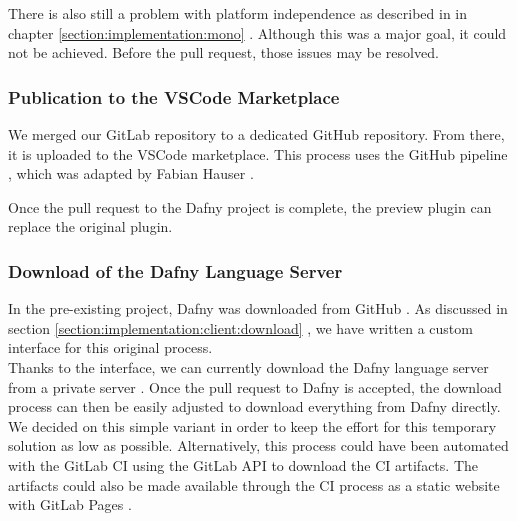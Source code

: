 There is also still a problem with platform independence as described in in chapter \ref{section:implementation:mono} .
Although this was a major goal, it could not be achieved.
Before the pull request, those issues may be resolved.


\subsubsection{Publication to the VSCode Marketplace}
We merged our GitLab repository to a dedicated GitHub repository.
From there, it is uploaded to the VSCode marketplace.
This process uses the GitHub pipeline , which
was adapted by Fabian Hauser \cite{our-dafny-plugin-github-publish}.

Once the pull request to the Dafny project is complete,
the preview plugin can replace the original plugin.


\subsubsection{Download of the Dafny Language Server}
In the pre-existing project, Dafny was downloaded from GitHub \cite{dafny_lang_builds}.
As discussed in section \ref{section:implementation:client:download} ,
we have written a custom interface for this original process.\\

Thanks to the interface, we can currently download the Dafny language server from a private server \cite{client-serverStringResources}.
Once the pull request to Dafny is accepted, the download process can then be easily adjusted to download everything from Dafny directly.\\

We decided on this simple variant in order to keep the effort for this temporary solution as low as possible.
Alternatively, this process could have been automated with the GitLab CI using the GitLab API \cite{gitlab-api} to download the CI artifacts.
The artifacts could also be made available through the CI process as a static website with GitLab Pages \cite{gitlab-pages}. 



